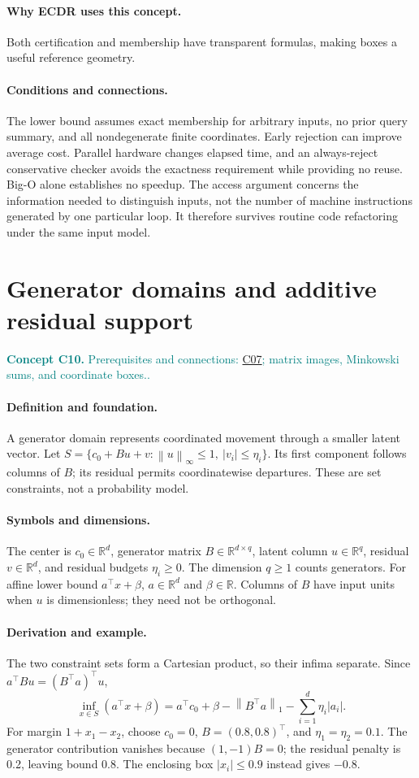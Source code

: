 \documentclass[11pt,a4paper]{article}
\newcommand{\R}{\mathbb R}
\newcommand{\norm}[1]{\left\lVert#1\right\rVert}
\newcommand{\abs}[1]{\left\lvert#1\right\rvert}
\newcommand{\conceptid}{Front matter}
\newcommand{\concept}[3]{\clearpage\renewcommand{\conceptid}{#1}%
\section{#2}\label{concept:#1}%
\textcolor{teal}{\textbf{Concept #1.} Prerequisites and connections: #3.}\par
\typeout{ECDR-CONCEPT-START #1 PAGE=\thepage}}
\begin{document}
\paragraph{Why ECDR uses this concept.}
Both certification and membership have transparent formulas, making boxes a useful reference geometry.
\paragraph{Conditions and connections.}
The lower bound assumes exact membership for arbitrary inputs, no prior query summary, and all nondegenerate finite coordinates. Early rejection can improve average cost. Parallel hardware changes elapsed time, and an always-reject conservative checker avoids the exactness requirement while providing no reuse. Big-O alone establishes no speedup. The access argument concerns the information needed to distinguish inputs, not the number of machine instructions generated by one particular loop. It therefore survives routine code refactoring under the same input model.
\par\label{endconcept:C09}

\concept{C10}{Generator domains and additive residual support}{\hyperref[concept:C07]{C07}; matrix images, Minkowski sums, and coordinate boxes.}
\paragraph{Definition and foundation.}
A generator domain represents coordinated movement through a smaller latent vector. Let $S=\{c_0+Bu+v:\norm{u}_\infty\le1,\ \abs{v_i}\le\eta_i\}$. Its first component follows columns of $B$; its residual permits coordinatewise departures. These are set constraints, not a probability model.
\paragraph{Symbols and dimensions.}
The center is $c_0\in\R^d$, generator matrix $B\in\R^{d\times q}$, latent column $u\in\R^q$, residual $v\in\R^d$, and residual budgets $\eta_i\ge0$. The dimension $q\ge1$ counts generators. For affine lower bound $a^\top x+\beta$, $a\in\R^d$ and $\beta\in\R$. Columns of $B$ have input units when $u$ is dimensionless; they need not be orthogonal.
\paragraph{Derivation and example.}
The two constraint sets form a Cartesian product, so their infima separate. Since $a^\top Bu=(B^\top a)^\top u$,
\[
 \inf_{x\in S}(a^\top x+\beta)
 =a^\top c_0+\beta-\norm{B^\top a}_1
   -\sum_{i=1}^d\eta_i\abs{a_i}.
\]
For margin $1+x_1-x_2$, choose $c_0=0$, $B=(0.8,0.8)^\top$, and $\eta_1=\eta_2=0.1$. The generator contribution vanishes because $(1,-1)B=0$; the residual penalty is 0.2, leaving bound 0.8. The enclosing box $\abs{x_i}\le0.9$ instead gives $-0.8$.
\end{document}

